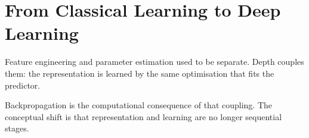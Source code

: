 \chapter{From Classical Learning to Deep Learning}
\label{ch:deep-learning}

Feature engineering and parameter estimation used to be separate. Depth couples them: the representation is learned by the same optimisation that fits the predictor.

Backpropagation is the computational consequence of that coupling. The conceptual shift is that representation and learning are no longer sequential stages.

